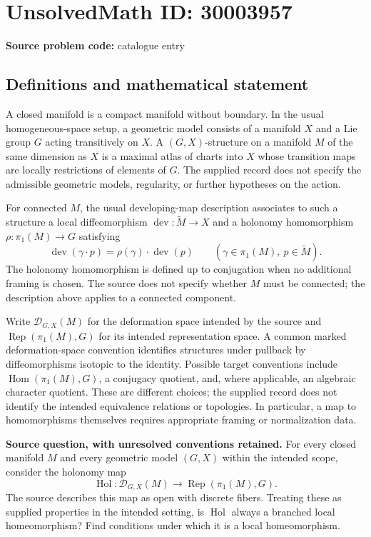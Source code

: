 \documentclass[11pt]{article}
\begin{document}
\section*{UnsolvedMath ID: 30003957}
\textbf{Source problem code:} catalogue entry
\subsection{Definitions and mathematical statement}
A closed manifold is a compact manifold without boundary. In the usual homogeneous-space setup, a geometric model consists of a manifold \(X\) and a Lie group \(G\) acting transitively on \(X\). A \((G,X)\)-structure on a manifold \(M\) of the same dimension as \(X\) is a maximal atlas of charts into \(X\) whose transition maps are locally restrictions of elements of \(G\). The supplied record does not specify the admissible geometric models, regularity, or further hypotheses on the action.

For connected \(M\), the usual developing-map description associates to such a structure a local diffeomorphism \(\operatorname{dev}\colon\widetilde M\to X\) and a holonomy homomorphism \(\rho\colon\pi_1(M)\to G\) satisfying
\[
\operatorname{dev}(\gamma\cdot p)=\rho(\gamma)\cdot\operatorname{dev}(p)
\qquad(\gamma\in\pi_1(M),\ p\in\widetilde M).
\]
The holonomy homomorphism is defined up to conjugation when no additional framing is chosen. The source does not specify whether \(M\) must be connected; the description above applies to a connected component.

Write \(\mathcal D_{G,X}(M)\) for the deformation space intended by the source and \(\operatorname{Rep}(\pi_1(M),G)\) for its intended representation space. A common marked deformation-space convention identifies structures under pullback by diffeomorphisms isotopic to the identity. Possible target conventions include \(\operatorname{Hom}(\pi_1(M),G)\), a conjugacy quotient, and, where applicable, an algebraic character quotient. These are different choices; the supplied record does not identify the intended equivalence relations or topologies. In particular, a map to homomorphisms themselves requires appropriate framing or normalization data.

\textbf{Source question, with unresolved conventions retained.} For every closed manifold \(M\) and every geometric model \((G,X)\) within the intended scope, consider the holonomy map
\[
\operatorname{Hol}\colon\mathcal D_{G,X}(M)\longrightarrow
\operatorname{Rep}(\pi_1(M),G).
\]
The source describes this map as open with discrete fibers. Treating these as supplied properties in the intended setting, is \(\operatorname{Hol}\) always a branched local homeomorphism? Find conditions under which it is a local homeomorphism.
\end{document}
